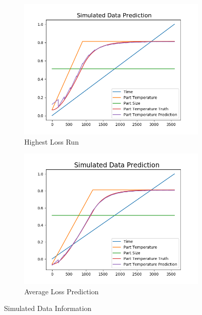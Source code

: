 \begin{figure}[ht]
\begin{subfigure}{.5\linewidth}
    	\includegraphics[width=\linewidth]{lstm/worst_sim_data.png}
        \caption{Highest Loss Run}
    \end{subfigure}
    \begin{subfigure}{.5\linewidth}
    	\centering
    	\includegraphics[width=\linewidth]{lstm/good_sim_data.png}
    	\caption{Average Loss Prediction}
    \end{subfigure}
    \caption{Simulated Data Information}
    \label{fig:simulated_data_lstm}
\end{figure}
\newpage
